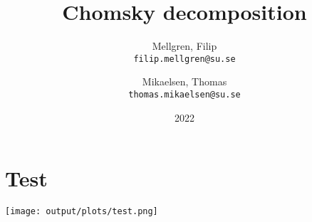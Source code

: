

\title{Chomsky decomposition}
\author{
	Mellgren, Filip\\
	\texttt{filip.mellgren@su.se}
	\and
	Mikaelsen, Thomas\\
	\texttt{thomas.mikaelsen@su.se}
}
\date{2022}


	
	\maketitle
	
	
	\section{Test}
	\texttt{[image: output/plots/test.png]}
	
